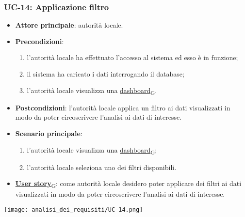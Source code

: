 \subsubsection{UC-14: Applicazione filtro}
\begin{itemize}
	\item \textbf{Attore principale}: autorità locale.
	\item \textbf{Precondizioni}:
	      \begin{enumerate}
		      \item l'autorità locale ha effettuato l'accesso al sistema ed esso è in funzione;
		      \item il sistema ha caricato i dati interrogando il database;
		      \item l'autorità locale visualizza una \href{https://7last.github.io/docs/pb/documentazione-interna/glossario\#dashboard}{dashboard\textsubscript{G}}.
	      \end{enumerate}
	\item \textbf{Postcondizioni}: l'autorità locale applica un filtro ai dati visualizzati in modo da poter circoscrivere l'analisi ai dati di interesse.
	\item \textbf{Scenario principale}:
	      \begin{enumerate}
		      \item l'autorità locale visualizza una \href{https://7last.github.io/docs/pb/documentazione-interna/glossario\#dashboard}{dashboard\textsubscript{G}};
		      \item l'autorità locale seleziona uno dei filtri disponibili.
	      \end{enumerate}
	\item \href{https://7last.github.io/docs/pb/documentazione-interna/glossario\#user-story}{\textbf{User story}\textsubscript{G}}:
	      come autorità locale desidero poter applicare dei filtri ai dati visualizzati in modo da poter circoscrivere l'analisi ai dati di interesse.
\end{itemize}
\begin{center}
	\texttt{[image: analisi\_dei\_requisiti/UC-14.png]}
\end{center}

